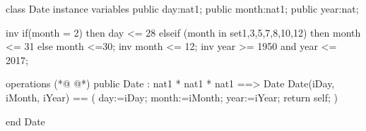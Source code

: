 \begin{vdmpp}[breaklines=true]
class Date
instance variables
  public day:nat1;
  public month:nat1;
  public year:nat;
 
 inv if(month = 2) then day <= 28 elseif (month in set{1,3,5,7,8,10,12}) then month <= 31 else month <=30;
 inv month <= 12;
 inv year >= 1950 and year <= 2017;

operations
(*@
\label{Date:12}
@*)
  public  Date : nat1 * nat1 * nat1  ==> Date
  Date(iDay, iMonth, iYear) == (
   day:=iDay;
   month:=iMonth;
   year:=iYear;
   return self;
  )

end Date
\end{vdmpp}
